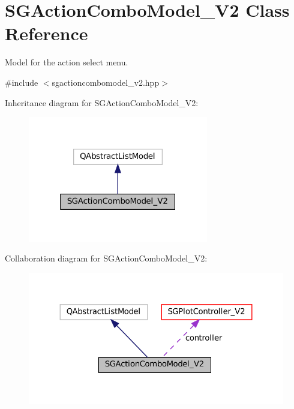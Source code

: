 \hypertarget{classSGActionComboModel__V2}{}\section{S\+G\+Action\+Combo\+Model\+\_\+\+V2 Class Reference}
\label{classSGActionComboModel__V2}


Model for the action select menu.  




{\ttfamily \#include $<$sgactioncombomodel\+\_\+v2.\+hpp$>$}



Inheritance diagram for S\+G\+Action\+Combo\+Model\+\_\+\+V2\+:
\nopagebreak
\begin{figure}[H]
\begin{center}
\leavevmode
\includegraphics[width=223pt]{classSGActionComboModel__V2__inherit__graph}
\end{center}
\end{figure}


Collaboration diagram for S\+G\+Action\+Combo\+Model\+\_\+\+V2\+:
\nopagebreak
\begin{figure}[H]
\begin{center}
\leavevmode
\includegraphics[width=324pt]{classSGActionComboModel__V2__coll__graph}
\end{center}
\end{figure}
